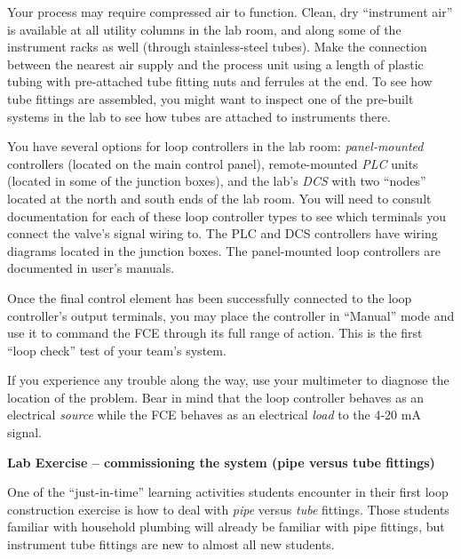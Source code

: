 Your process may require compressed air to function.  Clean, dry ``instrument air'' is available at all utility columns in the lab room, and along some of the instrument racks as well (through stainless-steel tubes).  Make the connection between the nearest air supply and the process unit using a length of plastic tubing with pre-attached tube fitting nuts and ferrules at the end.  To see how tube fittings are assembled, you might want to inspect one of the pre-built systems in the lab to see how tubes are attached to instruments there.

\vskip 10pt

You have several options for loop controllers in the lab room: {\it panel-mounted} controllers (located on the main control panel), remote-mounted {\it PLC} units (located in some of the junction boxes), and the lab's {\it DCS} with two ``nodes'' located at the north and south ends of the lab room.  You will need to consult documentation for each of these loop controller types to see which terminals you connect the valve's signal wiring to.  The PLC and DCS controllers have wiring diagrams located in the junction boxes.  The panel-mounted loop controllers are documented in user's manuals.

Once the final control element has been successfully connected to the loop controller's output terminals, you may place the controller in ``Manual'' mode and use it to command the FCE through its full range of action.  This is the first ``loop check'' test of your team's system.

\vskip 10pt

If you experience any trouble along the way, use your multimeter to diagnose the location of the problem.  Bear in mind that the loop controller behaves as an electrical {\it source} while the FCE behaves as an electrical {\it load} to the 4-20 mA signal.










\vfil \eject

\noindent
{\bf Lab Exercise -- commissioning the system (pipe versus tube fittings)}

\vskip 5pt

One of the ``just-in-time'' learning activities students encounter in their first loop construction exercise is how to deal with {\it pipe} versus {\it tube} fittings.  Those students familiar with household plumbing will already be familiar with pipe fittings, but instrument tube fittings are new to almost all new students.

